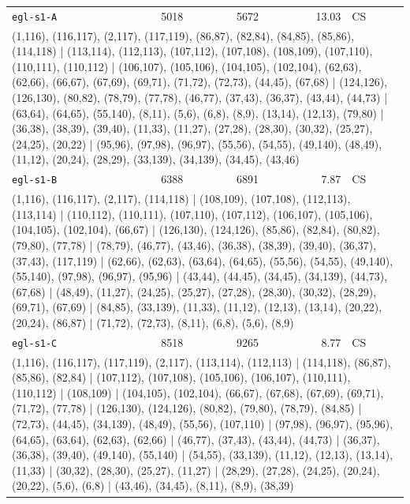 \begin{longtable}{lrrrl}
\texttt{egl-s1-A} & 5018 & 5672 & 13.03 & CS \\
\multicolumn{5}{p{0.96\linewidth}}{\tiny\raggedright\arraybackslash (1,116), (116,117), (2,117), (117,119), (86,87), (82,84), (84,85), (85,86), (114,118) | (113,114), (112,113), (107,112), (107,108), (108,109), (107,110), (110,111), (110,112) | (106,107), (105,106), (104,105), (102,104), (62,63), (62,66), (66,67), (67,69), (69,71), (71,72), (72,73), (44,45), (67,68) | (124,126), (126,130), (80,82), (78,79), (77,78), (46,77), (37,43), (36,37), (43,44), (44,73) | (63,64), (64,65), (55,140), (8,11), (5,6), (6,8), (8,9), (13,14), (12,13), (79,80) | (36,38), (38,39), (39,40), (11,33), (11,27), (27,28), (28,30), (30,32), (25,27), (24,25), (20,22) | (95,96), (97,98), (96,97), (55,56), (54,55), (49,140), (48,49), (11,12), (20,24), (28,29), (33,139), (34,139), (34,45), (43,46)} \\[2pt]
\texttt{egl-s1-B} & 6388 & 6891 & 7.87 & CS \\
\multicolumn{5}{p{0.96\linewidth}}{\tiny\raggedright\arraybackslash (1,116), (116,117), (2,117), (114,118) | (108,109), (107,108), (112,113), (113,114) | (110,112), (110,111), (107,110), (107,112), (106,107), (105,106), (104,105), (102,104), (66,67) | (126,130), (124,126), (85,86), (82,84), (80,82), (79,80), (77,78) | (78,79), (46,77), (43,46), (36,38), (38,39), (39,40), (36,37), (37,43), (117,119) | (62,66), (62,63), (63,64), (64,65), (55,56), (54,55), (49,140), (55,140), (97,98), (96,97), (95,96) | (43,44), (44,45), (34,45), (34,139), (44,73), (67,68) | (48,49), (11,27), (24,25), (25,27), (27,28), (28,30), (30,32), (28,29), (69,71), (67,69) | (84,85), (33,139), (11,33), (11,12), (12,13), (13,14), (20,22), (20,24), (86,87) | (71,72), (72,73), (8,11), (6,8), (5,6), (8,9)} \\[2pt]
\texttt{egl-s1-C} & 8518 & 9265 & 8.77 & CS \\
\multicolumn{5}{p{0.96\linewidth}}{\tiny\raggedright\arraybackslash (1,116), (116,117), (117,119), (2,117), (113,114), (112,113) | (114,118), (86,87), (85,86), (82,84) | (107,112), (107,108), (105,106), (106,107), (110,111), (110,112) | (108,109) | (104,105), (102,104), (66,67), (67,68), (67,69), (69,71), (71,72), (77,78) | (126,130), (124,126), (80,82), (79,80), (78,79), (84,85) | (72,73), (44,45), (34,139), (48,49), (55,56), (107,110) | (97,98), (96,97), (95,96), (64,65), (63,64), (62,63), (62,66) | (46,77), (37,43), (43,44), (44,73) | (36,37), (36,38), (39,40), (49,140), (55,140) | (54,55), (33,139), (11,12), (12,13), (13,14), (11,33) | (30,32), (28,30), (25,27), (11,27) | (28,29), (27,28), (24,25), (20,24), (20,22), (5,6), (6,8) | (43,46), (34,45), (8,11), (8,9), (38,39)} \\[2pt]

\end{longtable}
